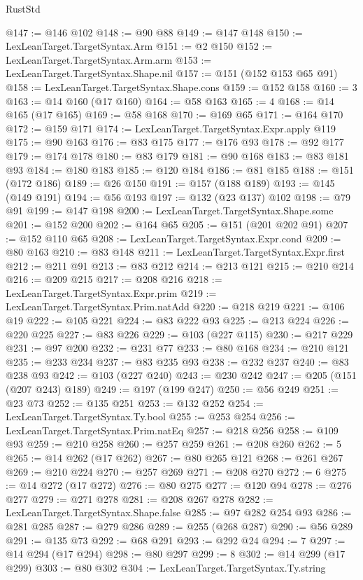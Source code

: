 \begin{lexlean}{RustStd}
\begin{coremodule}
@147 := @146 @102
@148 := @90 @88
@149 := @147 @148
@150 := LexLeanTarget.TargetSyntax.Arm
@151 := @2 @150
@152 := LexLeanTarget.TargetSyntax.Arm.arm
@153 := LexLeanTarget.TargetSyntax.Shape.nil
@157 := @151 (@152 @153 @65 @91)
@158 := LexLeanTarget.TargetSyntax.Shape.cons
@159 := @152 @158
@160 := 3
@163 := @14 @160 (@17 @160)
@164 := @58 @163
@165 := 4
@168 := @14 @165 (@17 @165)
@169 := @58 @168
@170 := @169 @65
@171 := @164 @170
@172 := @159 @171
@174 := LexLeanTarget.TargetSyntax.Expr.apply @119
@175 := @90 @163
@176 := @83 @175
@177 := @176 @93
@178 := @92 @177
@179 := @174 @178
@180 := @83 @179
@181 := @90 @168
@183 := @83 @181 @93
@184 := @180 @183
@185 := @120 @184
@186 := @81 @185
@188 := @151 (@172 @186)
@189 := @26 @150
@191 := @157 (@188 @189)
@193 := @145 (@149 @191)
@194 := @56 @193
@197 := @132 (@23 @137) @102
@198 := @79 @91
@199 := @147 @198
@200 := LexLeanTarget.TargetSyntax.Shape.some
@201 := @152 @200
@202 := @164 @65
@205 := @151 (@201 @202 @91)
@207 := @152 @110 @65
@208 := LexLeanTarget.TargetSyntax.Expr.cond
@209 := @80 @163
@210 := @83 @148
@211 := LexLeanTarget.TargetSyntax.Expr.first
@212 := @211 @91
@213 := @83 @212
@214 := @213 @121
@215 := @210 @214
@216 := @209 @215
@217 := @208 @216
@218 := LexLeanTarget.TargetSyntax.Expr.prim
@219 := LexLeanTarget.TargetSyntax.Prim.natAdd
@220 := @218 @219
@221 := @106 @19
@222 := @105 @221
@224 := @83 @222 @93
@225 := @213 @224
@226 := @220 @225
@227 := @83 @226
@229 := @103 (@227 @115)
@230 := @217 @229
@231 := @97 @200
@232 := @231 @77
@233 := @80 @168
@234 := @210 @121
@235 := @233 @234
@237 := @83 @235 @93
@238 := @232 @237
@240 := @83 @238 @93
@242 := @103 (@227 @240)
@243 := @230 @242
@247 := @205 (@151 (@207 @243) @189)
@249 := @197 (@199 @247)
@250 := @56 @249
@251 := @23 @73
@252 := @135 @251
@253 := @132 @252
@254 := LexLeanTarget.TargetSyntax.Ty.bool
@255 := @253 @254
@256 := LexLeanTarget.TargetSyntax.Prim.natEq
@257 := @218 @256
@258 := @109 @93
@259 := @210 @258
@260 := @257 @259
@261 := @208 @260
@262 := 5
@265 := @14 @262 (@17 @262)
@267 := @80 @265 @121
@268 := @261 @267
@269 := @210 @224
@270 := @257 @269
@271 := @208 @270
@272 := 6
@275 := @14 @272 (@17 @272)
@276 := @80 @275
@277 := @120 @94
@278 := @276 @277
@279 := @271 @278
@281 := @208 @267 @278
@282 := LexLeanTarget.TargetSyntax.Shape.false
@285 := @97 @282 @254 @93
@286 := @281 @285
@287 := @279 @286
@289 := @255 (@268 @287)
@290 := @56 @289
@291 := @135 @73
@292 := @68 @291
@293 := @292 @24
@294 := 7
@297 := @14 @294 (@17 @294)
@298 := @80 @297
@299 := 8
@302 := @14 @299 (@17 @299)
@303 := @80 @302
@304 := LexLeanTarget.TargetSyntax.Ty.string

\end{coremodule}
\end{lexlean}
